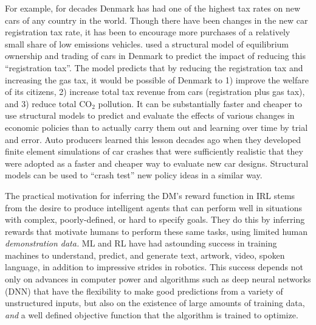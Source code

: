 For example, 
for decades Denmark has had one of the highest tax rates on new cars of any 
country in the world. Though there have been changes in the new car registration tax rate,
it has been to encourage more purchases of a relatively small share
of low emissions vehicles. \citet{GIMRS:2022} used a structural model of equilibrium ownership and trading of cars in Denmark
to predict the impact of reducing this ``registration tax''. The model predicts that by reducing the registration
tax and increasing the gas tax, it would be possible of Denmark to 1) improve the welfare of its citizens,
2) increase total tax revenue from cars (registration plus gas tax), and 3) reduce total $\mbox{CO}_2$ pollution.
It can be substantially faster and cheaper to use structural models to predict and evaluate the effects of 
various changes in economic policies than to actually carry them out and learning over time by trial and error. 
Auto producers learned this lesson decades ago when they developed finite element simulations
of car crashes that were sufficiently realistic that they were adopted as a faster and cheaper way to evaluate new car designs.
Structural models can be used to ``crash test'' new policy ideas in a similar way.

The practical motivation for inferring the DM's reward function in IRL  stems from the desire to produce
intelligent agents that can perform well in situations
with complex, poorly-defined, or hard to specify goals. They do this by inferring rewards
that motivate humans to perform  these same tasks,  using limited human {\it demonstration data.\/} 
ML and RL have had astounding success in training
machines to understand, predict, and generate text, artwork, video, spoken language, in addition to impressive strides in robotics.
This success depends not only on advances in computer power and
algorithms such as deep neural networks (DNN) that have the flexibility to make good predictions from a variety
of unstructured inputs, but also on the existence of large amounts of training data, {\it and\/} a well defined objective
function that the  algorithm  is trained to optimize. 

